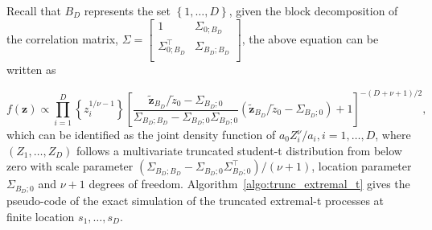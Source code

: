 \documentclass[12pt]{article}
\begin{document}
Recall that $B_D$ represents the set $\left\{ 1, \ldots, D\right\}$, given the block decomposition of the correlation matrix, $\Sigma = \begin{bmatrix}
	1 & \Sigma_{0;B_D} \\
	\Sigma_{0;B_D}^\top & \Sigma_{B_D;B_D} \\
\end{bmatrix}$, 
the above equation can be written as

\begin{equation*}
    f(\bm z) \propto \prod_{i=1}^D \left\{z_i^{1/\nu-1}\right\} 
    \left[ \frac{\tilde{\bm z}_{B_D}/\tilde{z}_0 - \Sigma_{B_D;0}}{\Sigma_{B_D;B_D} - \Sigma_{B_D;0}\Sigma_{B_D;0}}
    \left(\tilde{\bm z}_{B_D}/\tilde{z}_0 - \Sigma_{B_D;0}\right) + 1 \right]^{-(D+\nu+1)/2},    
\end{equation*}
which can be identified as the joint density function of $a_0 Z_i^\nu/a_i,i=1,\dots,D$, where $(Z_1,\dots,Z_D)$ follows a multivariate truncated student-t distribution from below zero with scale parameter $(\Sigma_{B_D;B_D} - \Sigma_{B_D;0} \Sigma_{B_D;0}^\top) / (\nu+1)$, location parameter $\Sigma_{B_D;0}$ and $\nu+1$ degrees of freedom. Algorithm~\ref{algo:trunc_extremal_t} gives the pseudo-code of the exact simulation of the truncated extremal-t processes at finite location $s_1,\dots,s_D$.
\end{document}
